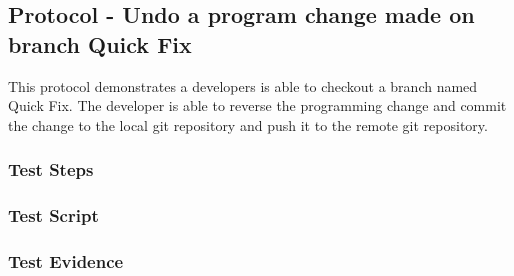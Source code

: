 \newpage
\subsection{Protocol - Undo a program change made on branch Quick Fix}
This protocol demonstrates a developers is able to checkout a branch
named Quick Fix.  The developer is able to reverse the programming
change and commit the change to the local git repository and push
it to the remote git repository.

\subsubsection{Test Steps}
      {}
      {}

\newpage
\subsubsection{Test Script}


\newpage
\subsubsection{Test Evidence}
      {}
      {}
